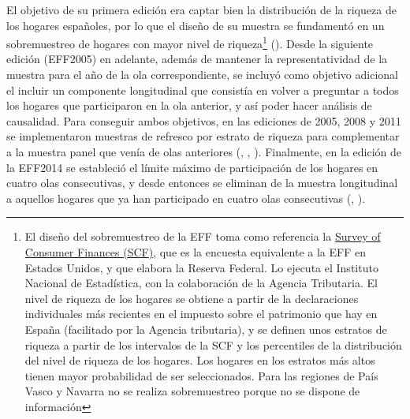 El objetivo de su primera edición era captar bien la distribución de la riqueza de los hogares españoles, por lo que el diseño de su muestra se fundamentó en un sobremuestreo de hogares con mayor nivel de riqueza\footnote{El diseño del sobremuestreo de la EFF toma como referencia la \href{https://www.federalreserve.gov/econres/scfindex.htm}{Survey of Consumer Finances (SCF)}, que es la encuesta equivalente a la EFF en Estados Unidos, y que elabora la Reserva Federal. Lo ejecuta el Instituto Nacional de Estadística, con la colaboración de la Agencia Tributaria. El nivel de riqueza de los hogares se obtiene a partir de la declaraciones individuales más recientes en el impuesto sobre el patrimonio que hay en España (facilitado por la Agencia tributaria), y se definen unos estratos de riqueza a partir de los intervalos de la SCF y los percentiles de la distribución del nivel de riqueza de los hogares. Los hogares en los estratos más altos tienen mayor probabilidad de ser seleccionados. Para las regiones de País Vasco y Navarra no se realiza sobremuestreo porque no se dispone de información} (\cite{effmethod2002}). Desde la siguiente edición (EFF2005) en adelante, además de mantener la representatividad de la muestra para el año de la ola correspondiente, se incluyó como objetivo adicional el incluir un componente longitudinal que consistía en volver a preguntar a todos los hogares que participaron en la ola anterior, y así poder hacer análisis de causalidad. Para conseguir ambos objetivos, en las ediciones de 2005, 2008 y 2011 se implementaron muestras de refresco por estrato de riqueza para complementar a la muestra panel que venía de olas anteriores (\cite{effmethod2005}, \cite{effmethod2008},  \cite{effmethod2011}). Finalmente, en la edición de la EFF2014 se estableció el límite máximo de participación de los hogares en cuatro olas consecutivas, y desde entonces se eliminan de la muestra longitudinal a aquellos hogares que ya han participado en cuatro olas consecutivas (\cite{effmethod2014}, \cite{effmethod2017}).

